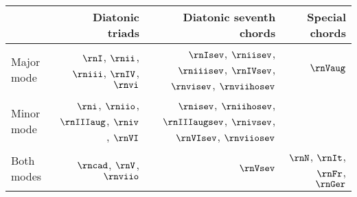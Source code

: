 \begin{tabular}{l|r|r|r}
            & Diatonic triads                                & Diatonic seventh chords                                                       & Special chords        \\
\hline
Major mode & $\rnI$, $\rnii$, $\rniii$, $\rnIV$, $\rnvi$     & $\rnIsev$, $\rniisev$, $\rniiisev$, $\rnIVsev$, $\rnvisev$, $\rnviihosev$     & $\rnVaug$                \\
\hline
Minor mode & $\rni$, $\rniio$, $\rnIIIaug$, $\rniv$, $\rnVI$ & $\rnisev$, $\rniihosev$, $\rnIIIaugsev$, $\rnivsev$, $\rnVIsev$, $\rnviiosev$ &                       \\
\hline
Both modes & $\rncad$, $\rnV$, $\rnviio$                     & $\rnVsev$                                                                     & $\rnN$, $\rnIt$, $\rnFr$, $\rnGer$
\end{tabular}

